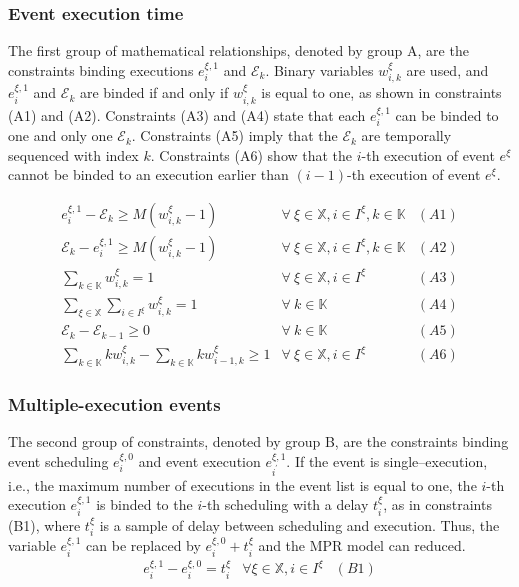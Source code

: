 \documentclass[]{interact}
\theoremstyle{plain}%
\theoremstyle{definition}
\theoremstyle{remark}
\begin{document}
\subsubsection{Event execution time}
The first group of mathematical relationships, denoted by group A, are the constraints binding executions $e^{\xi,1}_i$ and $\mathcal{E}_k$. Binary variables $w^{\xi}_{i,k}$ are used, and $e^{\xi,1}_i$ and $\mathcal{E}_k$ are binded if and only if $w^{\xi}_{i,k}$ is equal to one, as shown in constraints (A1) and (A2). Constraints (A3) and (A4) state that each $e^{\xi,1}_i$ can be binded to one and only one $\mathcal{E}_k$. Constraints (A5) imply that the $\mathcal{E}_{k}$ are temporally sequenced with index $k$. Constraints (A6) show that the $i$-th execution of event $e^{\xi}$ cannot be binded to an execution earlier than $(i-1)$-th execution of event $e^{\xi}$.

\begin{eqnarray}
e^{\xi,1}_i-\mathcal{E}_k\ge M(w^{\xi}_{i,k}-1) & \forall\ \xi\in\mathbb{X},i\in I^{\xi},k\in \mathbb{K}&(A1)\nonumber\\
\mathcal{E}_k-e^{\xi,1}_i\ge M(w^{\xi}_{i,k}-1) & \forall\ \xi\in\mathbb{X},i\in I^{\xi},k\in \mathbb{K}&(A2)\nonumber\\
\sum_{k\in \mathbb{K}} w^{\xi}_{i,k} =1& \forall\ \xi\in\mathbb{X},i\in I^{\xi}&(A3)\nonumber\\
\sum_{\xi\in \mathbb{X}}\sum_{i\in I^{\xi}} w^{\xi}_{i,k} =1&\forall\ k\in \mathbb{K}&(A4)\nonumber\\
\mathcal{E}_{k}-\mathcal{E}_{k-1}\ge 0&\forall\ k\in \mathbb{K}&(A5)\nonumber\\
\sum_{k\in \mathbb{K}} kw^{\xi}_{i,k} - \sum_{k\in \mathbb{K}} kw^{\xi}_{i-1,k} \ge 1&  \forall\ \xi\in\mathbb{X},i\in I^{\xi}&(A6)\nonumber
\end{eqnarray}

\subsubsection{Multiple-execution events}
The second group of constraints, denoted by group B, are the constraints binding event scheduling $e^{\xi,0}_i$ and event execution $e^{\xi,1}_{i^{'}}$. If the event is single--execution, i.e., the maximum number of executions in the event list is equal to one, the $i$-th execution $e^{\xi,1}_i$ is binded to the $i$-th scheduling with a delay $t^{\xi}_{i}$, as in constraints (B1), where $t^{\xi}_{i}$ is a sample of delay between scheduling and execution. Thus, the variable $e^{\xi,1}_{i} $ can be replaced by $e^{\xi,0}_{i} + t^{\xi}_{i}$ and the MPR model can reduced.
\begin{eqnarray}
e^{\xi,1}_{i} - e^{\xi,0}_{i} = t^{\xi}_{i} & \forall \xi\in\mathbb{X}, i\in I^{\xi}&(B1) \nonumber
\end{eqnarray}
\end{document}
